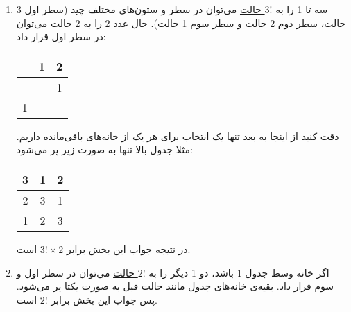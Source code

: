 \begin{enumerate}
    \item
  سه تا 1 را به 
	\underline{$3!$ حالت}
	 می‌توان در سطر و ستون‌های مختلف چید
	(سطر اول 3 حالت، سطر دوم 2 حالت و سطر سوم 1 حالت).
	حال عدد 2 را به 
   \underline{2 حالت}
  می‌توان در سطر اول قرار داد:
  \vspace*{+0.4cm}
	 \begin{center}
	\begin{tabular}{ |c|c|c| } 
     \hline
       & 1 & 2  \\ 
     \hline
       &   & 1 \\ 
     \hline
     1 &  &   \\ 
     \hline
    \end{tabular}
    \end{center}
    \vspace*{+0.4cm}
     ‌دقت کنید از اینجا به بعد تنها یک انتخاب برای هر یک از خانه‌های باقی‌مانده داریم.
      مثلا جدول بالا تنها به صورت زیر پر می‌شود:
    
    \begin{center}
	\begin{tabular}{ |c|c|c| } 
     \hline
      3 & 1 & 2 \\ 
     \hline
      2 & 3 & 1 \\ 
     \hline
      1 & 2 & 3 \\ 
     \hline
    \end{tabular}
    \end{center}
    \vspace*{+0.4cm}
     در نتیجه جواب این بخش برابر
    $3! \times 2$ 
    است.
    
    \item
    اگر خانه وسط جدول 1 باشد، دو 1 دیگر را به 
    \underline{$2!$ حالت}
    می‌توان در سطر اول و سوم قرار داد. بقیه‌ی خانه‌های جدول مانند حالت قبل به صورت یکتا پر می‌شود. پس جواب این بخش 
    برابر
    $2!$
    است.
    \end{enumerate}
